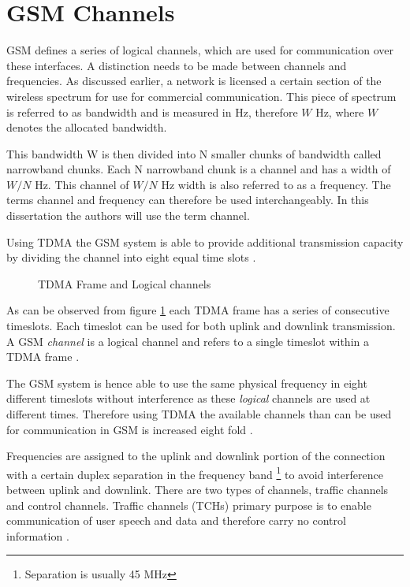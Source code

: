 \section{GSM Channels}
\label{sec:interfacech}
GSM defines a series of logical channels, which are used for communication over these interfaces. A distinction needs to be made between channels and frequencies. As discussed earlier, a network is licensed a certain section of the wireless spectrum for use for commercial communication. This piece of spectrum is referred to as bandwidth and is measured in Hz, therefore $W$ Hz, where $W$ denotes the allocated bandwidth\cite{FundamentalsWirelessCommunication}.

This bandwidth W is then divided into N smaller chunks of bandwidth called narrowband chunks. Each N narrowband chunk is a channel and has a width of $W/N$ Hz\cite{FundamentalsWirelessCommunication}. This channel of $W/N$ Hz width is also referred to as a frequency.
The terms channel and frequency can therefore be used interchangeably. In this dissertation the authors will use the term channel.

Using TDMA the GSM system is able to provide additional transmission capacity by dividing the channel into eight equal time slots \cite{wirelesstelcoMullet}. 
\begin{figure}[h]
	\begin{centering}
		
		\caption{TDMA Frame and Logical channels \cite{wirelesstelcoMullet}}
		\label{fig:GSMChannels}
	\end{centering}
\end{figure}
As can be observed from figure \ref{fig:GSMChannels} each TDMA frame has a series of consecutive timeslots. Each timeslot can be used for both uplink and downlink transmission. A GSM \emph{channel} is a logical channel and refers to a single timeslot within a TDMA frame \cite{wirelesstelcoMullet,GSMArchitectureProtocolsServices}.

The GSM system is hence able to use the same physical frequency in eight different timeslots without interference as these \emph{logical} channels are used at different times. Therefore using TDMA the available channels than can be used for communication in GSM is increased eight fold \cite{wirelesstelcoMullet}.

Frequencies are assigned to the uplink and downlink portion of the connection with a certain duplex separation in the frequency band \footnote{Separation is usually 45 MHz} to avoid interference between uplink and downlink. There are two types of channels, traffic channels and control channels. Traffic channels (TCHs) primary purpose is to enable communication of user speech and data and therefore carry no control information \cite{GSMArchitectureProtocolsServices}.

